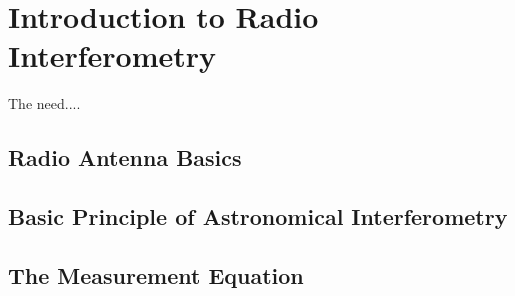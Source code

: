 

\chapter{Introduction to Radio Interferometry} 
\label{chap:2}

The need....

\section{Radio Antenna Basics}\label{sec:1}
\section{Basic Principle of Astronomical Interferometry}\label{sec:2}
\section{The Measurement Equation}\label{sec:3}
